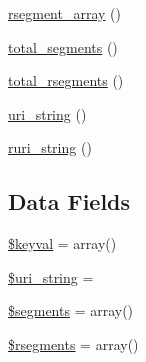 \begin{DoxyCompactItemize}
\item 
\mbox{\hyperlink{class_c_i___u_r_i_aaac2da0a6641a4a874a178442eb99624}{rsegment\+\_\+array}} ()
\item 
\mbox{\hyperlink{class_c_i___u_r_i_a5805c40e1c916e7b00b49f131765ac1c}{total\+\_\+segments}} ()
\item 
\mbox{\hyperlink{class_c_i___u_r_i_aead39329dc096b94eef0955fdcdd635f}{total\+\_\+rsegments}} ()
\item 
\mbox{\hyperlink{class_c_i___u_r_i_ac7a3f945c14cc37f89b6d9d1c7a037a4}{uri\+\_\+string}} ()
\item 
\mbox{\hyperlink{class_c_i___u_r_i_a53a97a8b68f500980b84e3b060400221}{ruri\+\_\+string}} ()
\end{DoxyCompactItemize}
\subsection*{Data Fields}
\begin{DoxyCompactItemize}
\item 
\mbox{\hyperlink{class_c_i___u_r_i_ae15942155aae4760439f552ad1fc3c34}{\$keyval}} = array()
\item 
\mbox{\hyperlink{class_c_i___u_r_i_ab908b3e655463a05e8a646c965ca4e53}{\$uri\+\_\+string}} = \textquotesingle{}\textquotesingle{}
\item 
\mbox{\hyperlink{class_c_i___u_r_i_a8d7f597e2b6cf2aaef663822d1b96a82}{\$segments}} = array()
\item 
\mbox{\hyperlink{class_c_i___u_r_i_abf60189292b5fda02cdf36e5d7417a33}{\$rsegments}} = array()
\end{DoxyCompactItemize}
